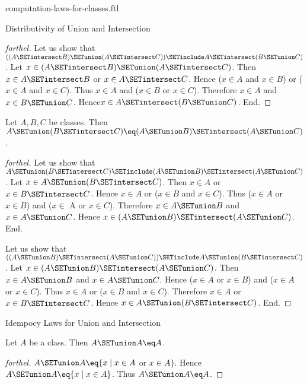 \documentclass{naproche-library}
\begin{document}
\begin{smodule}[title=Computation Laws For Classes]{computation-laws-for-classes.ftl}
\begin{sfragment}{Distributivity of Union and Intersection}
\begin{proof}[forthel]
    Let us show that $((A \SETintersect B) \SETunion (A \SETintersect C)) \SETinclude A \SETintersect (B \SETunion C)$. %
      Let $x \in (A \SETintersect B) \SETunion (A \SETintersect C)$.
      Then $x \in A \SETintersect B$ or $x \in A \SETintersect C$.
      Hence ($x \in A$ and $x \in B$) or ($x \in A$ and $x \in C$).
      Thus $x \in A$ and ($x \in B$ or $x \in C$).
      Therefore $x \in A$ and $x \in B \SETunion C$.
      Hence$ x \in A \SETintersect (B \SETunion C)$.
    End.
  \end{proof}

  \begin{proposition}[forthel,id=FOUNDATIONS_02_5937390721957888]
    Let $A, B, C$ be classes.
    Then $A \SETunion (B \SETintersect C) \eq (A \SETunion B) \SETintersect (A \SETunion C)$.
  \end{proposition}
  \begin{proof}[forthel]
    Let us show that $A \SETunion (B \SETintersect C) \SETinclude (A \SETunion B) \SETintersect (A \SETunion C)$.
      Let $x \in A \SETunion (B \SETintersect C)$.
      Then $x \in A$ or $x \in B \SETintersect C$.
      Hence $x \in A$ or ($x \in B$ and $x \in C$).
      Thus ($x \in A$ or $x \in B$) and ($x \in$ A or $x \in C$).
      Therefore $x \in A \SETunion B$ and $x \in A \SETunion C$.
      Hence $x \in (A \SETunion B) \SETintersect (A \SETunion C)$.
    End.

    Let us show that $((A \SETunion B) \SETintersect (A \SETunion C)) \SETinclude A \SETunion (B \SETintersect C)$. %
      Let $x \in (A \SETunion B) \SETintersect (A \SETunion C)$.
      Then $x \in A \SETunion B$ and $x \in A \SETunion C$.
      Hence ($x \in A$ or $x \in B$) and ($x \in A$ or $x \in C$).
      Thus $x \in A$ or ($x \in B$ and $x \in C$).
      Therefore $x \in A$ or $x \in B \SETintersect C$.
      Hence $x \in A \SETunion (B \SETintersect C)$.
    End.
  \end{proof}
\end{sfragment}

\begin{sfragment}{Idempocy Laws for Union and Intersection}
  \begin{proposition}[forthel,id=FOUNDATIONS_02_2096996737351680]
    Let $A$ be a class.
    Then $A \SETunion A \eq A$.
  \end{proposition}
  \begin{proof}[forthel]
    $A \SETunion A \eq \{x \mid x \in A$ or $x \in A \}$.
    Hence $A \SETunion A \eq \{ x \mid x \in A \}$.
    Thus $A \SETunion A \eq A$.
  \end{proof}


\end{sfragment}
\end{smodule}
\end{document}
